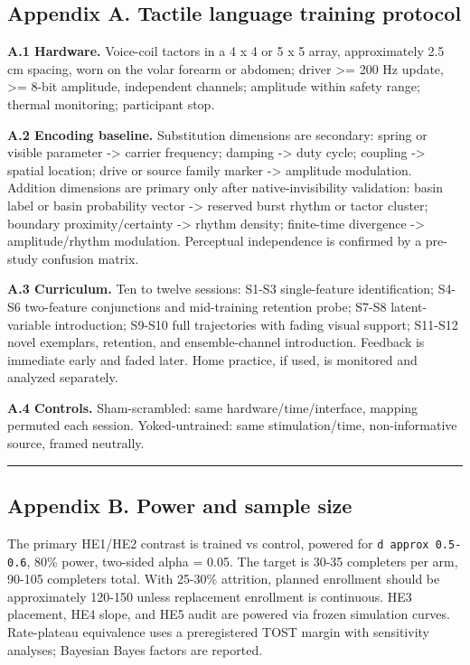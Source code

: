 \documentclass[
  11pt,
]{article}
\begin{document}
\subsection{Appendix A. Tactile language
training
protocol}\label{appendix-a.-tactile-language-training-protocol}

\textbf{A.1 Hardware.} Voice-coil tactors in a 4
x 4 or 5 x 5 array, approximately 2.5 cm
spacing, worn on the volar forearm or abdomen;
driver \textgreater= 200 Hz update,
\textgreater= 8-bit amplitude, independent
channels; amplitude within safety range; thermal
monitoring; participant stop.

\textbf{A.2 Encoding baseline.} Substitution
dimensions are secondary: spring or visible
parameter -\textgreater{} carrier frequency;
damping -\textgreater{} duty cycle; coupling
-\textgreater{} spatial location; drive or
source family marker -\textgreater{} amplitude
modulation. Addition dimensions are primary only
after native-invisibility validation: basin
label or basin probability vector
-\textgreater{} reserved burst rhythm or tactor
cluster; boundary proximity/certainty
-\textgreater{} rhythm density; finite-time
divergence -\textgreater{} amplitude/rhythm
modulation. Perceptual independence is confirmed
by a pre-study confusion matrix.

\textbf{A.3 Curriculum.} Ten to twelve sessions:
S1-S3 single-feature identification; S4-S6
two-feature conjunctions and mid-training
retention probe; S7-S8 latent-variable
introduction; S9-S10 full trajectories with
fading visual support; S11-S12 novel exemplars,
retention, and ensemble-channel introduction.
Feedback is immediate early and faded later.
Home practice, if used, is monitored and
analyzed separately.

\textbf{A.4 Controls.} Sham-scrambled: same
hardware/time/interface, mapping permuted each
session. Yoked-untrained: same stimulation/time,
non-informative source, framed neutrally.

\begin{center}\rule{0.5\linewidth}{0.5pt}\end{center}

\subsection{Appendix B. Power and sample
size}\label{appendix-b.-power-and-sample-size}

The primary HE1/HE2 contrast is trained vs
control, powered for
\texttt{d\ approx\ 0.5-0.6}, 80\% power,
two-sided alpha = 0.05. The target is 30-35
completers per arm, 90-105 completers total.
With 25-30\% attrition, planned enrollment
should be approximately 120-150 unless
replacement enrollment is continuous. HE3
placement, HE4 slope, and HE5 audit are powered
via frozen simulation curves. Rate-plateau
equivalence uses a preregistered TOST margin
with sensitivity analyses; Bayesian Bayes
factors are reported.
\end{document}
